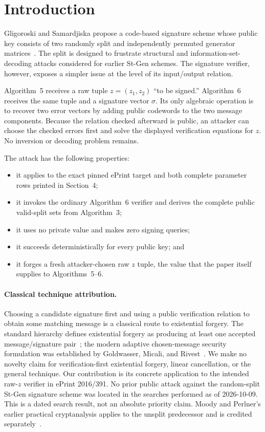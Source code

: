 \documentclass[10pt,a4paper]{article}
\begin{document}
\section{Introduction}

Gligoroski and Samardjiska propose a code-based signature scheme whose public
key consists of two randomly split and independently permuted generator
matrices~\cite{stgen}.  The split is designed to frustrate structural and
information-set-decoding attacks considered for earlier St-Gen schemes.  The
signature verifier, however, exposes a simpler issue at the level of its
input/output relation.

Algorithm~5 receives a raw tuple $z=(z_1,z_2)$ ``to be signed.''  Algorithm~6
receives the same tuple and a signature vector $\sigma$.  Its only algebraic
operation is to recover two error vectors by adding public codewords to the
two message components.  Because the relation checked afterward is public,
an attacker can choose the checked errors first and solve the displayed
verification equations for $z$.  No inversion or decoding problem remains.

The attack has the following properties:
\begin{itemize}
  \item it applies to the exact pinned ePrint target and both complete
  parameter rows printed in Section~4;
  \item it invokes the ordinary Algorithm~6 verifier and derives the complete
  public valid-split sets from Algorithm~3;
  \item it uses no private value and makes zero signing queries;
  \item it succeeds deterministically for every public key; and
  \item it forges a fresh attacker-chosen raw $z$ tuple, the value that the
  paper itself supplies to Algorithms~5--6.
\end{itemize}

\paragraph{Classical technique attribution.}
Choosing a candidate signature first and using a public verification relation
to obtain some matching message is a classical route to existential forgery.
The standard hierarchy defines existential forgery as producing at least one
accepted message/signature pair~\cite[\S11.2.4]{hac}; the modern adaptive
chosen-message security formulation was established by Goldwasser, Micali,
and Rivest~\cite{gmr}.  We make no novelty claim for verification-first
existential forgery, linear cancellation, or the general technique.  Our
contribution is its concrete application to the intended raw-$z$ verifier in
ePrint 2016/391.  No prior public attack against the random-split St-Gen
signature scheme was located in the searches performed as of 2026-10-09.  This
is a dated search result, not an absolute priority claim.  Moody and Perlner's
earlier practical cryptanalysis applies to the unsplit predecessor and is
credited separately~\cite{moodyperlner}.
\end{document}

